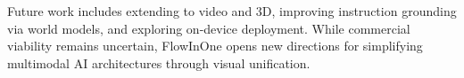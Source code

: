 \documentclass[11pt,a4paper]{article}
\begin{document}
Future work includes extending to video and 3D, improving instruction grounding via world models, and exploring on-device deployment. While commercial viability remains uncertain, FlowInOne opens new directions for simplifying multimodal AI architectures through visual unification.



\end{document}
